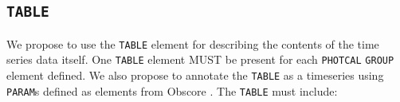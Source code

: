 \documentclass[11pt,a4paper]{ivoa}
\let\fg=\color
\def\elem#1{{\tt{\fg{DarkRed}#1}}}
\begin{document}
\subsection{\elem{TABLE}}
We propose to use the \elem{TABLE} element for describing the contents of the time series data itself. One \elem{TABLE} element MUST be present for each \texttt{PHOTCAL} \elem{GROUP} element defined. We also propose to annotate the \elem{TABLE} as a timeseries using \elem{PARAM}s defined as elements from Obscore \citep{std:OBSCORE1.1}.   
The \elem{TABLE} must include: 
\end{document}
